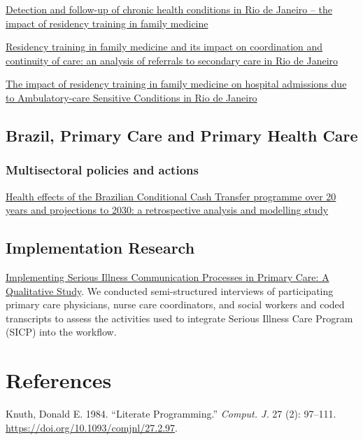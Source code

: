 \documentclass[
  letterpaper,
  DIV=11,
  numbers=noendperiod]{scrreprt}
\newlength{\cslhangindent}
\newenvironment{CSLReferences}[2] %
 {\begin{list}{}{%
  \setlength{\itemindent}{0pt}
  \setlength{\leftmargin}{0pt}
  \setlength{\parsep}{0pt}
  \ifodd #1
   \setlength{\leftmargin}{\cslhangindent}
   \setlength{\itemindent}{-1\cslhangindent}
  \fi
  \setlength{\itemsep}{#2\baselineskip}}}
 {\end{list}}
\begin{document}
\href{https://bmcprimcare.biomedcentral.com/articles/10.1186/s12875-021-01542-5}{Detection
and follow-up of chronic health conditions in Rio de Janeiro -- the
impact of residency training in family medicine}

\href{https://pmc.ncbi.nlm.nih.gov/articles/PMC8852675/pdf/bmjopen-2021-051515.pdf}{Residency
training in family medicine and its impact on coordination and
continuity of care: an analysis of referrals to secondary care in Rio de
Janeiro}

\href{https://journals.plos.org/globalpublichealth/article?id=10.1371/journal.pgph.0000547}{The
impact of residency training in family medicine on hospital admissions
due to Ambulatory-care Sensitive Conditions in Rio de Janeiro}

\section{Brazil, Primary Care and Primary Health
Care}\label{brazil-primary-care-and-primary-health-care}

\subsection{Multisectoral policies and
actions}\label{multisectoral-policies-and-actions}

\href{https://www.thelancet.com/journals/lanpub/article/PIIS2468-2667\%2825\%2900091-X/fulltext}{Health
effects of the Brazilian Conditional Cash Transfer programme over 20
years and projections to 2030: a retrospective analysis and modelling
study}

\section{Implementation Research}\label{implementation-research}

\href{https://pubmed.ncbi.nlm.nih.gov/32794412/}{Implementing Serious
Illness Communication Processes in Primary Care: A Qualitative Study}.
We conducted semi-structured interviews of participating primary care
physicians, nurse care coordinators, and social workers and coded
transcripts to assess the activities used to integrate Serious Illness
Care Program (SICP) into the workflow.


\chapter*{References}\label{references}


\label{refs}
\begin{CSLReferences}{1}{0}
Knuth, Donald E. 1984. {``Literate Programming.''} \emph{Comput. J.} 27
(2): 97--111. \url{https://doi.org/10.1093/comjnl/27.2.97}.

\end{CSLReferences}
\end{document}

